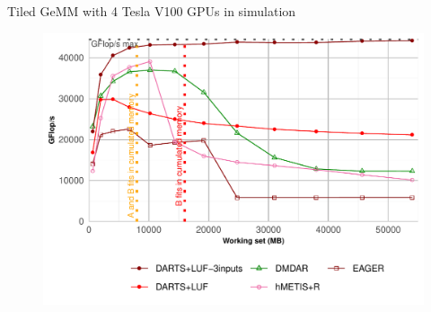 \documentclass{libs/ufc_format}
\begin{document}
\begin{frame}[noframenumbering]{Tiled GeMM with 4 Tesla V100 GPUs in simulation}
    \begin{figure}
        \centering
        \includegraphics[scale=0.45]{Images/GF_dynamic_data_aware_no_hfp_gemini-1-fgcs_4GPU_M3D.pdf}
    \end{figure}
\end{frame}
\end{document}
